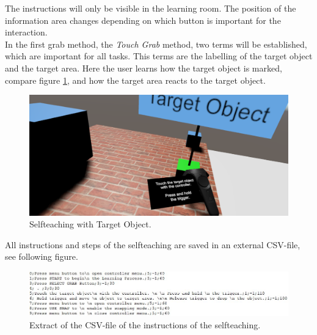 The instructions will only be visible in the learning room. The position of the information area changes depending on which button is important for the interaction. \\
In the first grab method, the \textit{Touch Grab} method, two terms will be established, which are important for all tasks. This terms are the labelling of the target object and the target area. Here the user learns how the target object is marked, compare figure \ref{fig:teaching3}, and how the target area reacts to the target object.

\begin{figure}[H] 
	\center 
	\includegraphics[width=12cm]{Images/teaching3.PNG}
	\caption[Selfteaching with Target Object.]{Selfteaching with Target Object.}
	\label{fig:teaching3}
\end{figure}

All instructions and steps of the selfteaching are saved in an external CSV-file, see following figure. 

\begin{figure}[H] 
	\center 
	\includegraphics[width=15cm]{Images/selfteachingCSV.JPG}
	\caption[Extract of the CSV-file of the instructions of the selfteaching.]{Extract of the CSV-file of the instructions of the selfteaching.}
	\label{fig:teachingCSV}
\end{figure}

